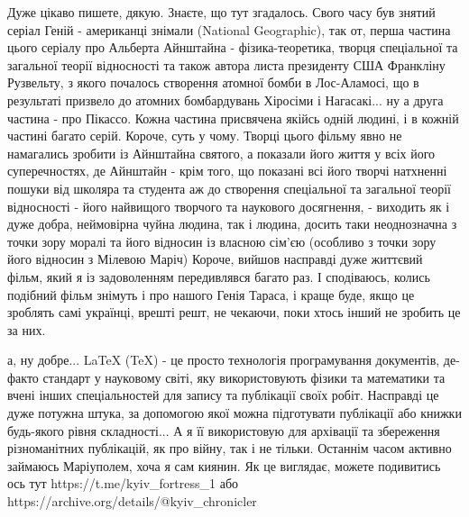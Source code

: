  
 
 
 
 


Дуже цікаво пишете, дякую. Знаєте, що тут згадалось. Свого часу був знятий
серіал Геній - американці знімали (National Geographic), так от, перша частина
цього серіалу про Альберта Айнштайна - фізика-теоретика, творця спеціальної та
загальної теорії відносності та також автора листа президенту США Франкліну
Рузвельту, з якого почалось створення атомної бомби в Лос-Аламосі, що в
результаті призвело до атомних бомбардувань Хіросіми і Нагасакі... ну а друга
частина - про Пікассо. Кожна частина присвячена якійсь одній людині, і в кожній
частині багато серій. Короче, суть у чому. Творці цього фільму явно не
намагались зробити із Айнштайна святого, а показали його життя у всіх його
суперечностях, де Айнштайн - крім того, що показані всі його творчі натхненні
пошуки від школяра та студента аж до створення спеціальної та загальної теорії
відносності - його найвищого творчого та наукового досягнення, - виходить як і
дуже добра, неймовірна чуйна людина, так і людина, досить таки неоднозначна з
точки зору моралі та його відносин із власною сім'єю (особливо з точки зору
його відносин з Мілевою Маріч) Короче, вийшов насправді дуже життєвий фільм,
який я із задоволенням передивлявся багато раз. І сподіваюсь, колись подібний
фільм знімуть і про нашого Генія Тараса, і краще буде, якщо це зроблять самі
українці, врешті решт, не чекаючи, поки хтось інший не зробить це за них.


а, ну добре... LaTeX (TeX) - це просто технологія програмування документів,
де-факто стандарт у науковому світі, яку використовують фізики та математики та
вчені інших спеціальностей для запису та публікації своїх робіт. Насправді це
дуже потужна штука, за допомогою якої можна підготувати публікації або книжки
будь-якого рівня складності... А я її використовую для архівації та збереження
різноманітних публікацій, як про війну, так і не тільки. Останнім часом активно
займаюсь Маріуполем, хоча я сам киянин. Як це виглядає, можете подивитись ось
тут https://t.me/kyiv_fortress_1 або
https://archive.org/details/@kyiv_chronicler

